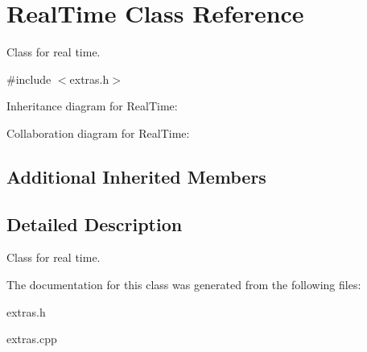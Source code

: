 \hypertarget{classRealTime}{}\section{Real\+Time Class Reference}
\label{classRealTime}


Class for real time.  




{\ttfamily \#include $<$extras.\+h$>$}



Inheritance diagram for Real\+Time\+:


Collaboration diagram for Real\+Time\+:
\subsection*{Additional Inherited Members}


\subsection{Detailed Description}
Class for real time. 

The documentation for this class was generated from the following files\+:\begin{DoxyCompactItemize}
\item 
extras.\+h\item 
extras.\+cpp\end{DoxyCompactItemize}
